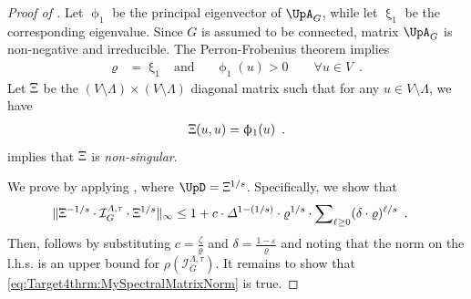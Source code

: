 \documentclass[11pt,reqno]{amsart}
\numberwithin{equation}{section}
\newcommand{\cI}{{\mathcal{I}}}
\newcommand{\applegreen}[1]{ {\color{applegreen}#1}}
\newcommand{\darkmagenta}[1]{{\color{darkmagenta}#1}}
\newcommand{\goldenbrown}[1]{{\color{goldenbrown}#1}}
\newcommand{\red}[1]{{\color{red}#1}}
\newcommand{\maxDeg}{{\Delta}}
\newcommand{\pfs}{\darkmagenta{s}}
\newcommand{\infmatrix}{\cI}
\newcommand{\spradius}{{\rho}}
\newcommand{\eigenval}{\upxi}
\newcommand{\norm}[2]{\goldenbrown{\|} #1 \goldenbrown{\|}_{#2}}
\newcommand{\Adjacency}{{\UpA}}
\newcommand{\aspradius}{{\varrho}}
\newcommand{\maxeigenv}{\upphi_1}
\renewcommand{\applegreen}[1]{#1}
\renewcommand{\darkmagenta}[1]{#1}
\renewcommand{\goldenbrown}[1]{#1}
\renewcommand{\red}[1]{#1}
\newcommand{\SpGMatrix}{\Upxi}
\newcommand{\kell}{{\color{green(pigment)}\ell}}%
\newcommand{\ku}{\red{u}}
\renewcommand{\kell}{\ell}
\renewcommand{\ku}{u}
\begin{document}
\begin{proof}[Proof of ]

Let $\maxeigenv$ be the principal eigenvector of $\Adjacency_G$, while let $\eigenval_1$ be the 
corresponding eigenvalue. Since $G$ is assumed to be connected, matrix $\Adjacency_G$ is 
non-negative and irreducible.  The Perron-Frobenius theorem implies 
\begin{align}\label{eq:PFT4thrm:AdjacencyPotentialSpIn}
\aspradius &=\eigenval_1& \textrm{and} && \maxeigenv(\ku)>0 \qquad \forall \ku\in V\enspace. 
\end{align}
Let $\SpGMatrix$ be the $(V\setminus \Lambda)\times (V\setminus \Lambda)$ diagonal matrix such 
that for any  $u\in V\setminus \Lambda$, we have 
\begin{align}\label{def:AdjMatrixEigenvals}
\SpGMatrix(\ku,\ku)=\maxeigenv(\ku) \enspace.
\end{align} 
  implies that $\SpGMatrix$ is {\em non-singular}. 



We prove  by applying , where 
$\UpD=\SpGMatrix^{1/\pfs}$. Specifically, we show that
\begin{align} \label{eq:Target4thrm:MySpectralMatrixNorm} 
\norm{ \SpGMatrix^{-1/\pfs} \cdot \infmatrix^{\Lambda, \tau}_G \cdot \SpGMatrix^{1/\pfs}}{\infty} &\leq 
1+c \cdot \maxDeg^{1-(1/\pfs)}\cdot
\aspradius^{{1}/{\pfs}} \cdot \sum\nolimits_{ \kell \geq 0} (\delta \cdot \aspradius)^{{\kell}/{\pfs}} \enspace.
\end{align}
Then,  follows by substituting $c=\frac{\zeta}{\aspradius}$ and 
$\delta=\frac{1-\varepsilon}{\aspradius}$  and noting that the norm on the l.h.s. is an upper bound for 
$\spradius( \infmatrix^{\Lambda,\tau}_{G})$.  It remains to show that \eqref{eq:Target4thrm:MySpectralMatrixNorm} 
is true. 




\end{proof}
\end{document}
